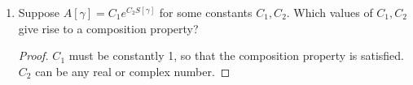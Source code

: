 \documentclass{book}
\theoremstyle{definition}
\begin{document}
\begin{enumerate}
	\begin{proof}
		We note that $S[\gamma_{12}] = S[\gamma_1] + S[\gamma_2]$ if $\gamma_{12}$ is composed of  $\gamma_1,\gamma_2$. So this factorization property follows.
	\end{proof}
	
	
	
	\item Suppose $A[\gamma] = C_1 e^{C_2 S[\gamma]}$ for some constants $C_1,C_2$. Which values of $C_1,C_2$ give rise to a composition property? 
	
	\begin{proof}
		$C_1$ must be constantly 1, so that the composition property is satisfied. $C_2$ can be any real or complex number. 
	\end{proof}
	

\end{enumerate}
\end{document}
